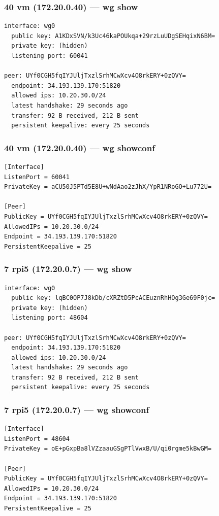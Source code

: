 \documentclass[11pt,a4paper]{article}
\begin{document}
\subsubsection*{40 vm (172.20.0.40) — wg show}
\begin{lstlisting}
interface: wg0
  public key: A1KDxSVN/k3Uc46kaPOUkqa+29rzLuUDgSEHqixN6BM=
  private key: (hidden)
  listening port: 60041

peer: UYf0CGH5fqIYJUljTxzlSrhMCwXcv4O8rkERY+0zQVY=
  endpoint: 34.193.139.170:51820
  allowed ips: 10.20.30.0/24
  latest handshake: 29 seconds ago
  transfer: 92 B received, 212 B sent
  persistent keepalive: every 25 seconds

\end{lstlisting}

\subsubsection*{40 vm (172.20.0.40) — wg showconf}
\begin{lstlisting}
[Interface]
ListenPort = 60041
PrivateKey = aCU50J5PTd5E8U+wNdAao2zJhX/YpR1NRoGO+Lu772U=

[Peer]
PublicKey = UYf0CGH5fqIYJUljTxzlSrhMCwXcv4O8rkERY+0zQVY=
AllowedIPs = 10.20.30.0/24
Endpoint = 34.193.139.170:51820
PersistentKeepalive = 25

\end{lstlisting}

\subsubsection*{7 rpi5 (172.20.0.7) — wg show}
\begin{lstlisting}
interface: wg0
  public key: lqBC0OP7J8kDb/cXRZtD5PcACEuznRhHOg3Ge69F0jc=
  private key: (hidden)
  listening port: 48604

peer: UYf0CGH5fqIYJUljTxzlSrhMCwXcv4O8rkERY+0zQVY=
  endpoint: 34.193.139.170:51820
  allowed ips: 10.20.30.0/24
  latest handshake: 29 seconds ago
  transfer: 92 B received, 212 B sent
  persistent keepalive: every 25 seconds

\end{lstlisting}

\subsubsection*{7 rpi5 (172.20.0.7) — wg showconf}
\begin{lstlisting}
[Interface]
ListenPort = 48604
PrivateKey = oE+pGxpBa8lVZzaauGSgPTlVwxB/U/qi0rgme5kBwGM=

[Peer]
PublicKey = UYf0CGH5fqIYJUljTxzlSrhMCwXcv4O8rkERY+0zQVY=
AllowedIPs = 10.20.30.0/24
Endpoint = 34.193.139.170:51820
PersistentKeepalive = 25

\end{lstlisting}
\end{document}
